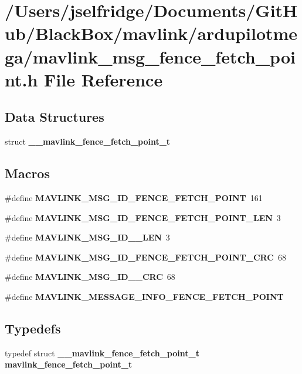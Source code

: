 \section{/\+Users/jselfridge/\+Documents/\+Git\+Hub/\+Black\+Box/mavlink/ardupilotmega/mavlink\+\_\+msg\+\_\+fence\+\_\+fetch\+\_\+point.h File Reference}
\label{mavlink__msg__fence__fetch__point_8h}
\subsection*{Data Structures}
\begin{DoxyCompactItemize}
\item 
struct \textbf{ \+\_\+\+\_\+mavlink\+\_\+fence\+\_\+fetch\+\_\+point\+\_\+t}
\end{DoxyCompactItemize}
\subsection*{Macros}
\begin{DoxyCompactItemize}
\item 
\#define \textbf{ M\+A\+V\+L\+I\+N\+K\+\_\+\+M\+S\+G\+\_\+\+I\+D\+\_\+\+F\+E\+N\+C\+E\+\_\+\+F\+E\+T\+C\+H\+\_\+\+P\+O\+I\+NT}~161
\item 
\#define \textbf{ M\+A\+V\+L\+I\+N\+K\+\_\+\+M\+S\+G\+\_\+\+I\+D\+\_\+\+F\+E\+N\+C\+E\+\_\+\+F\+E\+T\+C\+H\+\_\+\+P\+O\+I\+N\+T\+\_\+\+L\+EN}~3
\item 
\#define \textbf{ M\+A\+V\+L\+I\+N\+K\+\_\+\+M\+S\+G\+\_\+\+I\+D\+\_\+\_\+\+L\+EN}~3
\item 
\#define \textbf{ M\+A\+V\+L\+I\+N\+K\+\_\+\+M\+S\+G\+\_\+\+I\+D\+\_\+\+F\+E\+N\+C\+E\+\_\+\+F\+E\+T\+C\+H\+\_\+\+P\+O\+I\+N\+T\+\_\+\+C\+RC}~68
\item 
\#define \textbf{ M\+A\+V\+L\+I\+N\+K\+\_\+\+M\+S\+G\+\_\+\+I\+D\+\_\+\_\+\+C\+RC}~68
\item 
\#define \textbf{ M\+A\+V\+L\+I\+N\+K\+\_\+\+M\+E\+S\+S\+A\+G\+E\+\_\+\+I\+N\+F\+O\+\_\+\+F\+E\+N\+C\+E\+\_\+\+F\+E\+T\+C\+H\+\_\+\+P\+O\+I\+NT}
\end{DoxyCompactItemize}
\subsection*{Typedefs}
\begin{DoxyCompactItemize}
\item 
typedef struct \textbf{ \+\_\+\+\_\+mavlink\+\_\+fence\+\_\+fetch\+\_\+point\+\_\+t} \textbf{ mavlink\+\_\+fence\+\_\+fetch\+\_\+point\+\_\+t}
\end{DoxyCompactItemize}


